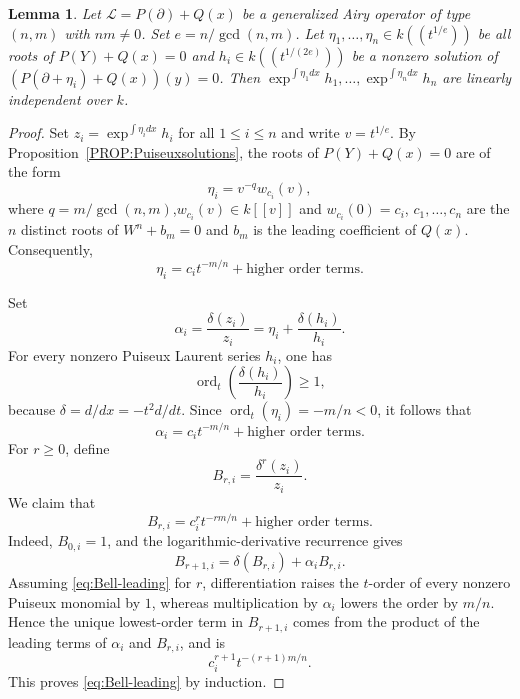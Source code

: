 \documentclass{article}
\newtheorem{lemma}[theorem]{Lemma}
\DeclareMathOperator{\ord}{ord}
\newcommand{\calL}{{\mathcal{L}}}
\begin{document}
\begin{lemma}
\label{LM:linearlyindependent}
Let $\calL=P(\partial)+Q(x)$ be a generalized Airy operator of type $(n,m)$ with $nm\neq 0$. Set $e=n/\gcd(n,m)$. Let $\eta_1,\dots,\eta_n\in k((t^{1/e}))$ be all roots of $P(Y)+Q(x)=0$ and $h_i\in k((t^{1/(2e)}))$ be a nonzero solution of $(P(\partial+\eta_i)+Q(x))(y)=0$. Then $\exp^{\int \eta_1 dx}h_1,\dots, \exp^{\int \eta_n dx}h_n$ are linearly independent over $k$.
\end{lemma}
\begin{proof}
Set $z_i=\exp^{\int \eta_i dx} h_i$ for all $1\leq i \leq n$ and write $v=t^{1/e}$. 
By Proposition~\ref{PROP:Puiseuxsolutions}, the roots of $P(Y)+Q(x)=0$ are of the form
\[
\eta_i=v^{-q}w_{c_i}(v),
\]
where $q=m/\gcd(n,m)$,$w_{c_i}(v)\in k[[v]]$ and $w_{c_i}(0)=c_i$, $c_1,\dots,c_n$ are the $n$ distinct roots of 
$
W^n+b_m=0
$
and $b_m$ is the leading coefficient of $Q(x)$.
Consequently,
\[
\eta_i=c_i t^{-m/n}+\text{higher order terms}.
\]

Set
\[
\alpha_i=\frac{\delta (z_i)}{z_i}
=\eta_i+\frac{\delta (h_i)}{h_i}.
\]
For every nonzero Puiseux Laurent series $h_i$, one has
\[
\ord_t\left(\frac{\delta (h_i)}{h_i}\right)\geq 1,
\]
because $\delta=d/dx=-t^2d/dt$. Since $\ord_t(\eta_i)=-m/n<0$, it
follows that
\begin{equation}\label{eq:alpha-leading}
\alpha_i=c_i t^{-m/n}+	\text{higher order terms}.
\end{equation}
For $r\geq 0$, define
\[
B_{r,i}=\frac{\delta^r (z_i)}{z_i}.
\]
We claim that
\begin{equation}\label{eq:Bell-leading}
B_{r,i}=c_i^r t^{-rm/n}
+\text{higher order terms}.
\end{equation}
Indeed, $B_{0,i}=1$, and the logarithmic-derivative recurrence gives
\[
B_{r+1,i}=\delta(B_{r,i})+\alpha_i B_{r,i}.
\]
Assuming \eqref{eq:Bell-leading} for $r$, differentiation raises the
$t$-order of every nonzero Puiseux monomial by $1$, whereas multiplication
by $\alpha_i$ lowers the order by $m/n$. Hence the unique lowest-order
term in $B_{r+1,i}$ comes from the product of the leading terms of
$\alpha_i$ and $B_{r,i}$, and is
\[
c_i^{r+1}t^{-(r+1)m/n}.
\]
This proves \eqref{eq:Bell-leading} by induction.


\end{proof}
\end{document}
